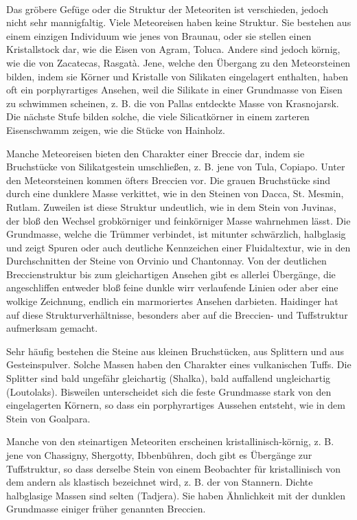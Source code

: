 \documentclass[a4paper, 11pt, oneside, polutonikogreek, german]{article}
\begin{document}
\paragraph*{}
Das gröbere Gefüge oder die Struktur der Meteoriten ist verschieden, jedoch nicht sehr mannigfaltig. Viele Meteoreisen haben keine Struktur. Sie bestehen aus einem einzigen Individuum wie jenes von Braunau, oder sie stellen einen Kristallstock dar, wie die Eisen von Agram, Toluca. Andere sind jedoch körnig, wie die von Zacatecas, Rasgatà. Jene, welche den Übergang zu den Meteorsteinen bilden, indem sie Körner und Kristalle von Silikaten eingelagert enthalten, haben oft ein porphyrartiges Ansehen, weil die Silikate in einer Grundmasse von Eisen zu schwimmen scheinen, z. B. die von Pallas entdeckte Masse von Krasnojarsk. Die nächste Stufe bilden solche, die viele Silicatkörner in einem zarteren Eisenschwamm zeigen, wie die Stücke von Hainholz.

Manche Meteoreisen bieten den Charakter einer Breccie dar, indem sie Bruchstücke von Silikatgestein umschließen, z. B. jene von Tula, Copiapo. Unter den Meteorsteinen kommen öfters Breccien vor. Die grauen Bruchstücke sind durch eine dunklere Masse verkittet, wie in den Steinen von Dacca, St. Mesmin, Rutlam. Zuweilen ist diese Struktur undeutlich, wie in dem Stein von Juvinas, der bloß den Wechsel grobkörniger und feinkörniger Masse wahrnehmen lässt. Die Grundmasse, welche die Trümmer verbindet, ist mitunter schwärzlich, halbglasig und zeigt Spuren oder auch deutliche Kennzeichen einer Fluidaltextur, wie in den Durchschnitten der Steine von Orvinio und Chantonnay. Von der deutlichen Breccienstruktur bis zum gleichartigen Ansehen gibt es allerlei Übergänge, die angeschliffen entweder bloß feine dunkle wirr verlaufende Linien oder aber eine wolkige Zeichnung, endlich ein marmoriertes Ansehen darbieten. Haidinger hat auf diese Strukturverhältnisse, besonders aber auf die Breccien- und Tuffstruktur aufmerksam gemacht.

Sehr häufig bestehen die Steine aus kleinen Bruchstücken, aus Splittern und aus Gesteinspulver. Solche Massen haben den Charakter eines vulkanischen Tuffs. Die Splitter sind bald ungefähr gleichartig (Shalka), bald auffallend ungleichartig (Loutolaks). Bisweilen unterscheidet sich die feste Grundmasse stark von den eingelagerten Körnern, so dass ein porphyrartiges Aussehen entsteht, wie in dem Stein von Goalpara.

Manche von den steinartigen Meteoriten erscheinen kristallinisch-körnig, z. B. jene von Chassigny, Shergotty, Ibbenbühren, doch gibt es Übergänge zur Tuffstruktur, so dass derselbe Stein von einem Beobachter für kristallinisch von dem andern als klastisch bezeichnet wird, z. B. der von Stannern. Dichte halbglasige Massen sind selten (Tadjera). Sie haben Ähnlichkeit mit der dunklen Grundmasse einiger früher genannten Breccien.
\end{document}
